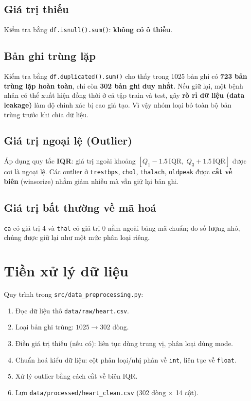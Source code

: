 \subsection{Giá trị thiếu}
Kiểm tra bằng \texttt{df.isnull().sum()}: \textbf{không có ô thiếu}.

\subsection{Bản ghi trùng lặp}
Kiểm tra bằng \texttt{df.duplicated().sum()} cho thấy trong 1025 bản ghi có
\textbf{723 bản trùng lặp hoàn toàn}, chỉ còn \textbf{302 bản ghi duy nhất}.
Nếu giữ lại, một bệnh nhân có thể xuất hiện đồng thời ở cả tập train và test,
gây \textbf{rò rỉ dữ liệu (data leakage)} làm độ chính xác bị cao giả tạo. Vì
vậy nhóm loại bỏ toàn bộ bản trùng trước khi chia dữ liệu.

\subsection{Giá trị ngoại lệ (Outlier)}
Áp dụng quy tắc \textbf{IQR}: giá trị ngoài khoảng
$[Q_1 - 1.5\,\mathrm{IQR},\; Q_3 + 1.5\,\mathrm{IQR}]$ được coi là ngoại lệ.
Các outlier ở \texttt{trestbps}, \texttt{chol}, \texttt{thalach},
\texttt{oldpeak} được \textbf{cắt về biên} (winsorize) nhằm giảm nhiễu mà vẫn
giữ lại bản ghi.

\subsection{Giá trị bất thường về mã hoá}
\texttt{ca} có giá trị 4 và \texttt{thal} có giá trị 0 nằm ngoài bảng mã chuẩn;
do số lượng nhỏ, chúng được giữ lại như một mức phân loại riêng.

\section{Tiền xử lý dữ liệu}
Quy trình trong \texttt{src/data\_preprocessing.py}:
\begin{enumerate}
  \item Đọc dữ liệu thô \texttt{data/raw/heart.csv}.
  \item Loại bản ghi trùng: $1025 \rightarrow 302$ dòng.
  \item Điền giá trị thiếu (nếu có): liên tục dùng trung vị, phân loại dùng mode.
  \item Chuẩn hoá kiểu dữ liệu: cột phân loại/nhị phân về \texttt{int}, liên tục
        về \texttt{float}.
  \item Xử lý outlier bằng cách cắt về biên IQR.
  \item Lưu \texttt{data/processed/heart\_clean.csv} (302 dòng $\times$ 14 cột).
\end{enumerate}


